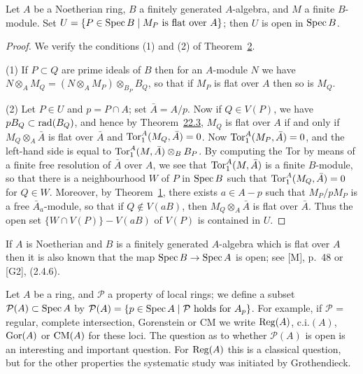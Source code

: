 \begin{theorem}\label{thm:24.3}
Let $A$ be a Noetherian ring, $B$ a finitely generated $A$-algebra, and $M$ a
finite $B$-module. Set $U = \{P \in \operatorname{Spec} B \mid M_P \text{ is flat over } A\}$;
then $U$ is open in $\operatorname{Spec} B$.
\end{theorem}

\begin{proof}
We verify the conditions (1) and (2) of Theorem~\hyperref[thm:24.2]{2}.

(1) If $P \subset Q$ are prime ideals of $B$ then for an $A$-module $N$ we have
$N \otimes_A M_Q = (N \otimes_A M_P) \otimes_{B_P} B_Q$, so that if $M_P$ is flat over $A$
then so is $M_Q$.

(2) Let $P \in U$ and $p = P \cap A$; set $\bar{A} = A/p$. Now if $Q \in V(P)$, we have
$pB_Q \subset \operatorname{rad}(B_Q)$, and hence by Theorem~\hyperref[thm:22.3]{22.3}, $M_Q$ is flat over $A$ if and
only if $M_Q \otimes_A \bar{A}$ is flat over $\bar{A}$ and $\operatorname{Tor}^A_1(M_Q, \bar{A}) = 0$.
Now $\operatorname{Tor}^A_1(M_P, \bar{A}) = 0$, and the left-hand side is equal to
$\operatorname{Tor}^A_1(M, \bar{A}) \otimes_B B_P$. By computing the Tor by means of a finite free
resolution of $\bar{A}$ over $A$, we see that $\operatorname{Tor}^A_1(M, \bar{A})$ is a finite $B$-module,
so that there is a neighbourhood $W$ of $P$ in $\operatorname{Spec} B$ such that
$\operatorname{Tor}^A_1(M_Q, \bar{A}) = 0$ for $Q \in W$. Moreover, by
Theorem~\hyperref[thm:24.1]{1}, there exists $a \in A - p$ such that $M_P/pM_P$ is a free
$\bar{A}_a$-module, so that if $Q \notin V(aB)$, then $M_Q \otimes_A \bar{A}$ is flat over
$\bar{A}$. Thus the open set $\{W \cap V(P)\} - V(aB)$ of $V(P)$ is contained in
$U$.
\end{proof}

\begin{remark}
If $A$ is Noetherian and $B$ is a finitely generated $A$-algebra which is flat over
$A$ then it is also known that the map $\operatorname{Spec} B \to \operatorname{Spec} A$ is open; see [M],
p.~48 or [G2], (2.4.6).
\end{remark}

Let $A$ be a ring, and $\mathcal{P}$ a property of local rings; we define a subset
$\mathcal{P}(A) \subset \operatorname{Spec} A$ by $\mathcal{P}(A) = \{p \in \operatorname{Spec} A \mid \mathcal{P} \text{ holds for } A_p\}$.
For example, if $\mathcal{P}$ = regular, complete intersection, Gorenstein or CM we
write $\operatorname{Reg}(A)$, $\mathrm{c.i.}(A)$, $\operatorname{Gor}(A)$ or $\operatorname{CM}(A)$ for these loci. The question as to
whether $\mathcal{P}(A)$ is open is an interesting and important question. For $\operatorname{Reg}(A)$
this is a classical question, but for the other properties the systematic study
was initiated by Grothendieck.

